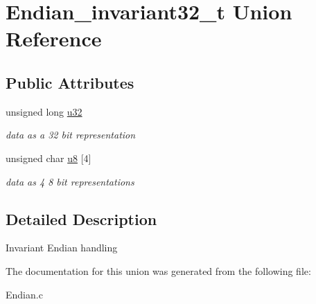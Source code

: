\hypertarget{union_endian__invariant32__t}{}\section{Endian\+\_\+invariant32\+\_\+t Union Reference}
\label{union_endian__invariant32__t}
\subsection*{Public Attributes}
\begin{DoxyCompactItemize}
\item 
\hypertarget{union_endian__invariant32__t_abf65890224098c39d3322b0946ff6f62}{}unsigned long \hyperlink{union_endian__invariant32__t_abf65890224098c39d3322b0946ff6f62}{u32}\label{union_endian__invariant32__t_abf65890224098c39d3322b0946ff6f62}

\begin{DoxyCompactList}\small\item\em data as a 32 bit representation \end{DoxyCompactList}\item 
\hypertarget{union_endian__invariant32__t_a5bb5471b8ccbb670c4201536db388c5b}{}unsigned char \hyperlink{union_endian__invariant32__t_a5bb5471b8ccbb670c4201536db388c5b}{u8} \mbox{[}4\mbox{]}\label{union_endian__invariant32__t_a5bb5471b8ccbb670c4201536db388c5b}

\begin{DoxyCompactList}\small\item\em data as 4 8 bit representations \end{DoxyCompactList}\end{DoxyCompactItemize}


\subsection{Detailed Description}
Invariant Endian handling 

The documentation for this union was generated from the following file\+:\begin{DoxyCompactItemize}
\item 
Endian.\+c\end{DoxyCompactItemize}
